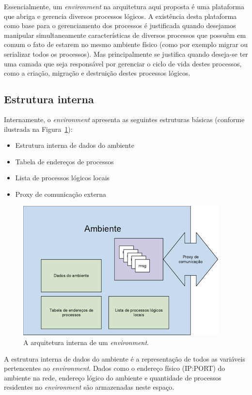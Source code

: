 Essencialmente, um \textit{environment} na arquitetura aqui proposta é uma plataforma que abriga e gerencia diversos processos lógicos. A existência desta plataforma como base para o gerenciamento dos processos é justificada quando desejamos manipular simultaneamente características de diversos processos que possuêm em comum o fato de estarem no mesmo ambiente físico (como por exemplo migrar ou serializar todos os processos). Mas principalmente se justifica quando deseja-se ter uma camada que seja responsável por gerenciar o ciclo de vida destes processos, como a criação, migração e destruição destes processos lógicos.

\subsection{Estrutura interna}

Internamente, o \textit{environment} apresenta as seguintes estruturas básicas (conforme ilustrada na Figura~\ref{fig:environment_1}):

\begin{itemize}
\item Estrutura interna de dados do ambiente
\item Tabela de endereços de processos
\item Lista de processos lógicos locais
\item Proxy de comunicação externa
\end{itemize}

\begin{figure}
  \centerline{\includegraphics{Environment_1.png}}
  \caption{A arquitetura interna de um \textit{environment}.}
\label{fig:environment_1}
\end{figure}

A estrutura interna de dados do ambiente é a representação de todos as variáveis pertencentes ao \textit{environment}. Dados como o endereço físico (IP:PORT) do ambiente na rede, endereço lógico do ambiente e quantidade de processos residentes no \textit{environment} são armazenadas neste espaço.

